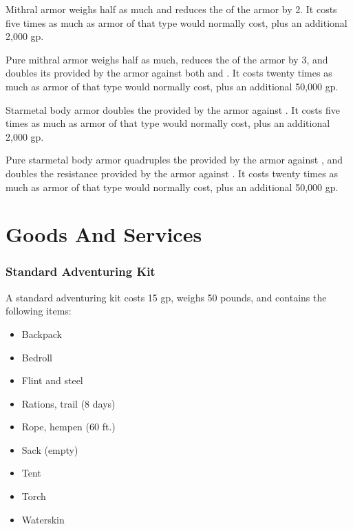          Mithral armor weighs half as much and reduces the  of the armor by 2.
        It costs five times as much as armor of that type would normally cost, plus an additional 2,000 gp.

         Pure mithral armor weighs half as much, reduces the  of the armor by 3, and doubles its  provided by the armor against both  and .
        It costs twenty times as much as armor of that type would normally cost, plus an additional 50,000 gp.

         Starmetal body armor doubles the  provided by the armor against .
        It costs five times as much as armor of that type would normally cost, plus an additional 2,000 gp.

         Pure starmetal body armor quadruples the  provided by the armor against , and doubles the resistance provided by the armor against .
        It costs twenty times as much as armor of that type would normally cost, plus an additional 50,000 gp.

\section{Goods And Services}

    \subsubsection{Standard Adventuring Kit}
        A standard adventuring kit costs 15 gp, weighs 50 pounds, and contains the following items:
        \begin{itemize}
            \item Backpack
            \item Bedroll
            \item Flint and steel
            \item Rations, trail (8 days)
            \item Rope, hempen (60 ft.)
            \item Sack (empty)
            \item Tent
            \item Torch
            \item Waterskin
        \end{itemize}

